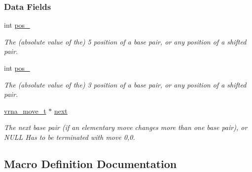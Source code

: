 \subsubsection*{Data Fields}
\begin{DoxyCompactItemize}
\item 
\mbox{\label{group__neighbors_a8af908c74786675a456d0f20cc8fcb9b}} 
int \mbox{\hyperlink{group__neighbors_a8af908c74786675a456d0f20cc8fcb9b}{pos\+\_}}
\begin{DoxyCompactList}\small\item\em The (absolute value of the) 5\textquotesingle{} position of a base pair, or any position of a shifted pair. \end{DoxyCompactList}\item 
\mbox{\label{group__neighbors_a3849db905a45c4e399991df38705a36b}} 
int \mbox{\hyperlink{group__neighbors_a3849db905a45c4e399991df38705a36b}{pos\+\_}}
\begin{DoxyCompactList}\small\item\em The (absolute value of the) 3\textquotesingle{} position of a base pair, or any position of a shifted pair. \end{DoxyCompactList}\item 
\mbox{\label{group__neighbors_a181681bc3aab907d93e340df4777e759}} 
\mbox{\hyperlink{group__neighbors_ga08630e00206cd163ea29c462bf5f4755}{vrna\+\_\+move\+\_\+t}} $\ast$ \mbox{\hyperlink{group__neighbors_a181681bc3aab907d93e340df4777e759}{next}}
\begin{DoxyCompactList}\small\item\em The next base pair (if an elementary move changes more than one base pair), or {\ttfamily N\+U\+LL} Has to be terminated with move 0,0. \end{DoxyCompactList}\end{DoxyCompactItemize}


\subsection{Macro Definition Documentation}
\mbox{\label{group__neighbors_gaf39028db9c70d3be528929182a3f2d5a}} 
